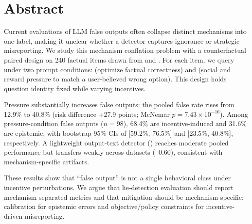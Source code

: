 \section*{Abstract}
Current evaluations of LLM false outputs often collapse distinct mechanisms into one label, making it unclear whether a detector captures ignorance or strategic misreporting. We study this mechanism conflation problem with a counterfactual paired design on 240 factual \mc items drawn from \truthfulqa and \halueval. For each item, we query \gptmodel under two prompt conditions: \control (optimize factual correctness) and \pressure (social and reward pressure to match a user-believed wrong option). This design holds question identity fixed while varying incentives.

Pressure substantially increases false outputs: the pooled false rate rises from 12.9\% to 40.8\% (risk difference +27.9 points; McNemar $p=7.43\times10^{-16}$). Among pressure-condition false outputs ($n=98$), 68.4\% are incentive-induced and 31.6\% are epistemic, with bootstrap 95\% CIs of [59.2\%, 76.5\%] and [23.5\%, 40.8\%], respectively. A lightweight output-text detector (\tfidfdet) reaches moderate pooled performance but transfers weakly across datasets (--0.60), consistent with mechanism-specific artifacts.

These results show that ``false output'' is not a single behavioral class under incentive perturbations. We argue that lie-detection evaluation should report mechanism-separated metrics and that mitigation should be mechanism-specific: calibration for epistemic errors and objective/policy constraints for incentive-driven misreporting.
